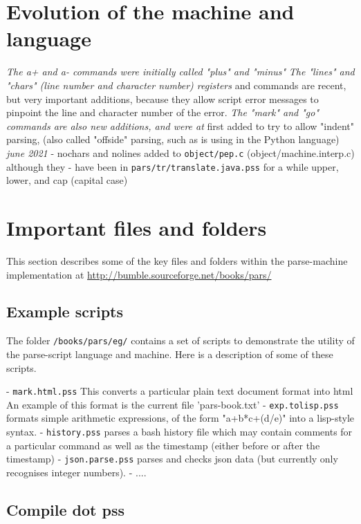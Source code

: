 \documentclass[a4paper,12pt]{article}
\begin{document}
\section{Evolution of the machine and language}
 \emph{ The a+ and a- commands were initially called "plus" and "minus" }
 \emph{ The "lines" and "chars" (line number and character number) registers }
    and commands are recent, but very important additions, because they
    allow script error messages to pinpoint the line and character number
    of the error.
 \emph{ The "mark" and "go" commands are also new additions, and were at  }
    first added to try to allow "indent" parsing, (also called "offside"
    parsing, such as is using in the Python language)
 \emph{ june 2021 }
    - nochars and nolines added to \texttt{object/pep.c} (object/machine.interp.c) although they
    - have been in \texttt{pars/tr/translate.java.pss} for a while
      upper, lower, and cap (capital case)

\section{Important files and folders}

  This section describes some of the key files and folders within
  the parse-machine implementation at
  \url{http://bumble.sourceforge.net/books/pars/}

\subsection{Example scripts}

   The folder \texttt{/books/pars/eg/} contains a set of scripts to demonstrate
   the utility of the parse-script language and machine. Here is a
   description of some of these scripts.

   - \texttt{mark.html.pss}
      This converts a particular plain text document format into html
      An example of this format is the current file 'pars-book.txt'
   - \texttt{exp.tolisp.pss}
      formats simple arithmetic expressions, of the form
      "a+b*c+(d/e)" into a lisp-style syntax.
   - \texttt{history.pss}
      parses a bash history file which may contain comments for
      a particular command as well as the timestamp (either
      before or after the timestamp)
   - \texttt{json.parse.pss}
      parses and checks json data (but currently only recognises
      integer numbers).
   - ....

\subsection{Compile dot pss}
\end{document}

